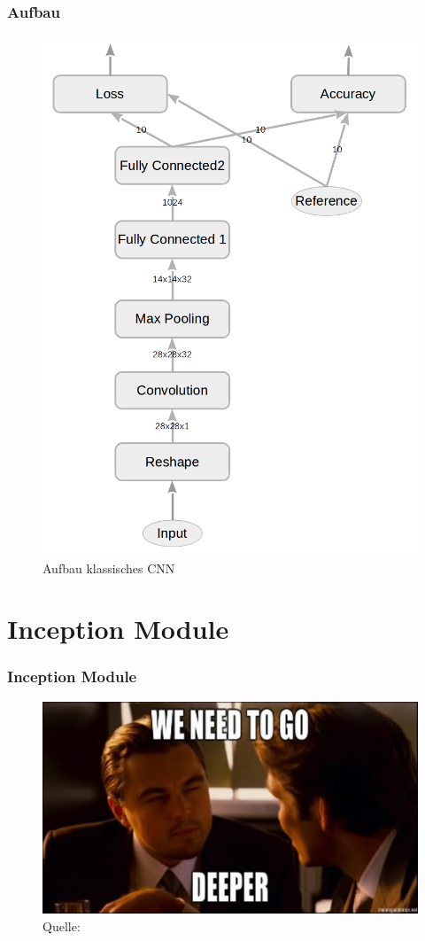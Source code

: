 \documentclass{beamer}
\begin{document}
\begin{frame}
	\frametitle{Aufbau}
	\begin{figure}
		\includegraphics[width=0.4\linewidth]{images/main_graph_conv_reduced.png}
		\caption{Aufbau klassisches CNN}
		\label{fig:main_graph_conv}
	\end{figure}
\end{frame}

\section{Inception Module}

\begin{frame}
	\frametitle{Inception Module}
	\begin{figure}
		\includegraphics[width=0.8\linewidth]{images/inception_meme.jpg}\\
		\hspace*{0pt}\hbox{\scriptsize Quelle:}
		\label{fig:inception_meme}
	\end{figure}
	
\end{frame}
\end{document}
